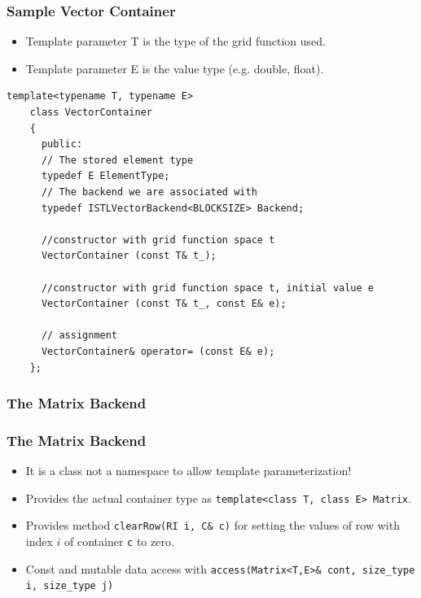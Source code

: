 \begin{frame}[fragile]
  \frametitle{Sample Vector Container}
  \begin{itemize}
  \item Template parameter T is the type of the grid function used.
  \item Template parameter E is the value type (e.g. double, float).
  \end{itemize}
  \begin{lstlisting}[basicstyle=\scriptsize]
    template<typename T, typename E>
    class VectorContainer 
    {
      public:
      // The stored element type
      typedef E ElementType;
      // The backend we are associated with
      typedef ISTLVectorBackend<BLOCKSIZE> Backend;
      
      //constructor with grid function space t
      VectorContainer (const T& t_);

      //constructor with grid function space t, initial value e
      VectorContainer (const T& t_, const E& e);
      
      // assignment
      VectorContainer& operator= (const E& e);
    };
  \end{lstlisting}
\end{frame}
\subsubsection{The Matrix Backend}
\label{sec:matrix-backend}

\begin{frame}
  \frametitle<presentation>{The Matrix Backend}
  \begin{itemize}
  \item It is a class not a namespace to allow template
    parameterization!
  \item Provides the actual container type as
    \lstinline!template<class T, class E> Matrix!.
  \item Provides method \lstinline!clearRow(RI i, C& c)! for setting
    the values of row with index $i$ of container \lstinline!c! to
    zero.
    \item Const and mutable data access with 
    \lstinline!access(Matrix<T,E>& cont, size_type i, size_type j)!
  \end{itemize}
\end{frame}

